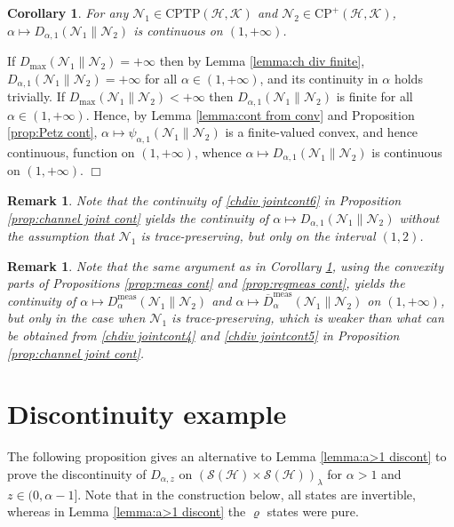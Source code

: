 \documentclass[unsortedaddress,superscriptaddress,pra,notitlepage]{revtex4}
\newtheorem{rem}[definition]{Remark}
\newtheorem{cor}[definition]{Corollary}
\newenvironment{proof}[1][Proof]{\begin{trivlist}
\item[\hskip \labelsep {\bfseries #1}]}{\hfill$\Box$\end{trivlist}}
\def\N{\mathcal{N}}
\def\S{{\mathcal S}}
\def\rho{\varrho}
\def\hil{{\mathcal H}}
\def\kil{{\mathcal K}}
\def\oll{\overline}
\def\CP{\mathrm{CP}}
\def\cptp{\mathrm{CPTP}}
\def\meas{\mathrm{meas}}
\begin{document}
\begin{cor}\label{ex:ch cont from ch conv}
For any $\N_1\in\cptp(\hil,\kil)$ and $\N_2\in\CP^+(\hil,\kil)$,
$\alpha\mapsto D_{\alpha,1}(\N_1\|\N_2)$ is
continuous on $(1,+\infty)$.
\end{cor}
\begin{proof}
If $D_{\max}(\N_1\|\N_2)=+\infty$ then by Lemma \ref{lemma:ch div finite},
$D_{\alpha,1}(\N_1\|\N_2)=+\infty$
for all $\alpha\in(1,+\infty)$, and its
continuity in $\alpha$ holds trivially. 
If $D_{\max}(\N_1\|\N_2)<+\infty$ then 
$D_{\alpha,1}(\N_1\|\N_2)$
is finite for all $\alpha\in(1,+\infty)$. Hence, by 
Lemma \ref{lemma:cont from conv} and
Proposition \ref{prop:Petz cont}, 
$\alpha\mapsto \psi_{\alpha,1}(\N_1\|\N_2)$ is a finite-valued convex, and hence continuous, function
on $(1,+\infty)$, whence $\alpha\mapsto D_{\alpha,1}(\N_1\|\N_2)$ is continuous on $(1,+\infty)$.
\end{proof}

\begin{rem}
Note that the continuity of \eqref{chdiv jointcont6} in Proposition \ref{prop:channel joint cont} yields the continuity of 
$\alpha\mapsto D_{\alpha,1}(\N_1\|\N_2)$ without the assumption that $\N_1$ is 
trace-preserving, but only on the interval $(1,2)$.
\end{rem}

\begin{rem}
Note that the same argument as in Corollary \ref{ex:ch cont from ch conv}, 
using the convexity parts of Propositions
\ref{prop:meas cont} and \ref{prop:regmeas cont}, yields the continuity of 
$\alpha\mapsto D_{\alpha}^{\meas}(\N_1\|\N_2)$
and 
$\alpha\mapsto \oll{D}_{\alpha}^{\meas}(\N_1\|\N_2)$
on $(1,+\infty)$, but only in the case when $\N_1$ is trace-preserving, which is weaker than what can be obtained from \eqref{chdiv jointcont4} and \eqref{chdiv jointcont5} in Proposition 
\ref{prop:channel joint cont}.
\end{rem}

\section{Discontinuity example}
\label{sec:discont ex}

The following proposition gives an alternative 
to Lemma \ref{lemma:a>1 discont} to prove
the discontinuity of $D_{\alpha,z}$ on $(\S(\hil)\times\S(\hil))_{\lambda}$ 
for $\alpha>1$ and $z\in(0,\alpha-1]$.
Note that in the construction below, all states are invertible, whereas in 
Lemma \ref{lemma:a>1 discont} the $\rho$ states were pure.
\end{document}

